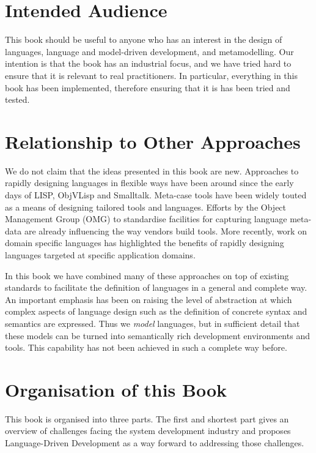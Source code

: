 \section*{Intended Audience}

This book should be useful to anyone who has an interest in the
design of languages, language and model-driven development, and
metamodelling. Our intention is that the book has an industrial
focus, and we have tried hard to ensure that it is relevant to
real practitioners. In particular, everything in this book has
been implemented, therefore ensuring that it is has been tried and
tested.

\section*{Relationship to Other Approaches}

We do not claim that the ideas presented in this book are new.
Approaches to rapidly designing languages in flexible ways have
been around since the early days of LISP, ObjVLisp and Smalltalk.
Meta-case tools have been widely touted as a means of designing
tailored tools and languages. Efforts by the Object Management
Group (OMG) to standardise facilities for capturing language
meta-data are already influencing the way vendors build tools.
More recently, work on domain specific languages has highlighted
the benefits of rapidly designing languages targeted at specific
application domains.

In this book we have combined many of these approaches on top of
existing standards to facilitate the definition of languages in a
general and complete way. An important emphasis has been on
raising the level of abstraction at which complex aspects of
language design such as the definition of concrete syntax and
semantics are expressed. Thus we {\em model} languages, but in
sufficient detail that these models can be turned into
semantically rich development environments and tools. This
capability has not been achieved in such a complete way before.

\section*{Organisation of this Book}

This book is organised into three parts. The first and shortest
part gives an overview of challenges facing the system development
industry and proposes Language-Driven Development as a way forward
to addressing those challenges.

